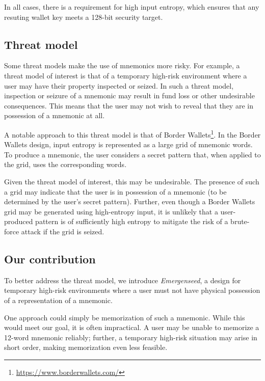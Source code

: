 \documentclass{article}
\begin{document}
In all cases, there is a requirement for high input entropy, which ensures that any resuting wallet key meets a 128-bit security target.


\subsection{Threat model}

Some threat models make the use of mnemonics more risky.
For example, a threat model of interest is that of a temporary high-risk environment where a user may have their property inspected or seized.
In such a threat model, inspection or seizure of a mnemonic may result in fund loss or other undesirable consequences.
This means that the user may not wish to reveal that they are in possession of a mnemonic at all.

A notable approach to this threat model is that of Border Wallets\footnote{\url{https://www.borderwallets.com/}}.
In the Border Wallets design, input entropy is represented as a large grid of mnemonic words.
To produce a mnemonic, the user considers a secret pattern that, when applied to the grid, uses the corresponding words.

Given the threat model of interest, this may be undesirable.
The presence of such a grid may indicate that the user is in possession of a mnemonic (to be determined by the user's secret pattern).
Further, even though a Border Wallets grid may be generated using high-entropy input, it is unlikely that a user-produced pattern is of sufficiently high entropy to mitigate the risk of a brute-force attack if the grid is seized.


\subsection{Our contribution}

To better address the threat model, we introduce \textit{Emergenseed}, a design for temporary high-risk environments where a user must not have physical possession of a representation of a mnemonic.

One approach could simply be memorization of such a mnemonic.
While this would meet our goal, it is often impractical.
A user may be unable to memorize a 12-word mnemonic reliably; further, a temporary high-risk situation may arise in short order, making memorization even less feasible.
\end{document}
